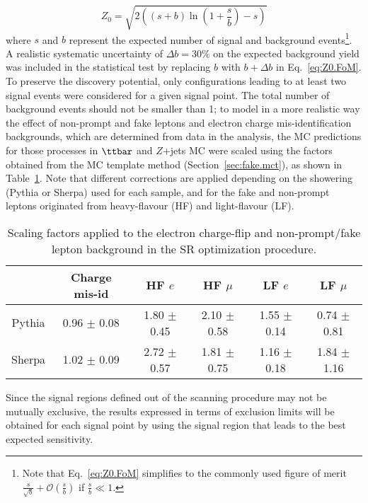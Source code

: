 \begin{equation}
Z_0 = \sqrt{2\left(\left(s+b\right)\ln\left(1+\frac{s}{b}\right)-s\right)}
\label{eq:Z0.FoM}
\end{equation}
where $s$ and $b$ represent the expected number of signal and background events\footnote{Note that Eq.~\ref{eq:Z0.FoM} simplifies to the commonly used figure of merit 
$\frac{s}{\sqrt{b}} + \mathcal{O}\left(\frac{s}{b}\right)$ if $\frac{s}{b} \ll 1$.}.
A realistic systematic uncertainty of $\Delta b=30\%$ on the expected background yield 
was included in the statistical test by replacing $b$ with $b + \Delta b$ in Eq.~\ref{eq:Z0.FoM}.
To preserve the discovery potential, only configurations leading to at least two signal events were considered for a given signal point. The total number of background events should not be smaller than 1; to model in a more realistic way the effect of non-prompt and fake leptons and electron charge mis-identification backgrounds, 
which are determined from data in the analysis, 
the MC predictions for those processes in $\ttbar$ and $Z$+jets MC were scaled 
using the factors obtained from the MC template method (Section~\ref{sec:fake.mct}), as shown in Table~\ref{tab:mctemplateF}.
Note that different corrections are applied depending on the showering (Pythia or Sherpa) used for each sample, 
and for the fake and non-prompt leptons originated from heavy-flavour (HF) and light-flavour (LF).

\begin{table}[!htb]
\caption{Scaling factors applied to the electron charge-flip and non-prompt/fake lepton background in the SR optimization procedure.}
\label{tab:mctemplateF}
\def\arraystretch{1.1}
\centering
\begin{tabular}{|c||c|c|c|c|c|}
\hline 
& Charge mis-id & HF $e$ & HF $\mu$ & LF $e$ & LF $\mu$ \\ \hline\hline
Pythia & 0.96 $\pm$ 0.08 & 1.80 $\pm$ 0.45 & 2.10 $\pm$ 0.58 & 1.55 $\pm$ 0.14 & 0.74 $\pm$ 0.81\\\hline
Sherpa & 1.02 $\pm$ 0.09 & 2.72 $\pm$ 0.57 & 1.81 $\pm$ 0.75 & 1.16 $\pm$ 0.18 & 1.84 $\pm$ 1.16\\
\hline
\end{tabular}
\end{table}

Since the signal regions defined out of the scanning procedure may not be mutually exclusive,
the results expressed in terms of exclusion limits will be obtained for each signal point 
by using the signal region that leads to the best expected sensitivity.

